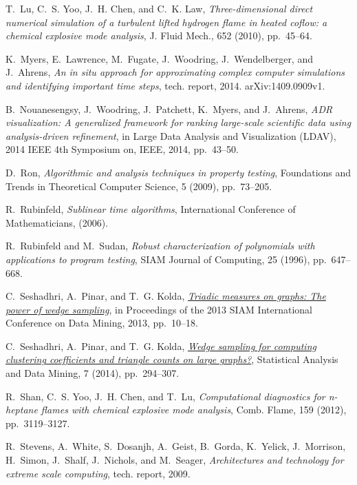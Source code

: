 \documentclass[final]{siamltex}
\begin{document}
\begin{thebibliography}{10}
{\sc T.~Lu, C.~S. Yoo, J.~H. Chen, and C.~K. Law}, {\em Three-dimensional
  direct numerical simulation of a turbulent lifted hydrogen flame in heated
  coflow: a chemical explosive mode analysis}, J. Fluid Mech., 652 (2010),
  pp.~45--64.

{\sc K.~Myers, E.~Lawrence, M.~Fugate, J.~Woodring, J.~Wendelberger, and
  J.~Ahrens}, {\em An in situ approach for approximating complex computer
  simulations and identifying important time steps}, tech. report, 2014.
\newblock arXiv:1409.0909v1.

{\sc B.~Nouanesengsy, J.~Woodring, J.~Patchett, K.~Myers, and J.~Ahrens}, {\em
  {ADR} visualization: A generalized framework for ranking large-scale
  scientific data using analysis-driven refinement}, in Large Data Analysis and
  Visualization (LDAV), 2014 IEEE 4th Symposium on, IEEE, 2014, pp.~43--50.

{\sc D.~Ron}, {\em Algorithmic and analysis techniques in property testing},
  Foundations and Trends in Theoretical Computer Science, 5 (2009),
  pp.~73--205.

{\sc R.~Rubinfeld}, {\em Sublinear time algorithms}, International Conference
  of Mathematicians,  (2006).

{\sc R.~Rubinfeld and M.~Sudan}, {\em Robust characterization of polynomials
  with applications to program testing}, SIAM Journal of Computing, 25 (1996),
  pp.~647--668.

{\sc C.~Seshadhri, A.~Pinar, and T.~G. Kolda},
  \href{http://dx.doi.org/10.1137/1.9781611972832.2}{{\em Triadic measures on
  graphs: The power of wedge sampling}}, in Proceedings of the 2013 SIAM
  International Conference on Data Mining, 2013, pp.~10--18.

{\sc C.~Seshadhri, A.~Pinar, and T.~G. Kolda},
  \href{http://dx.doi.org/10.1002/sam.11224}{{\em Wedge sampling for computing
  clustering coefficients and triangle counts on large graphs?}}, Statistical
  Analysis and Data Mining, 7 (2014), pp.~294--307.

{\sc R.~Shan, C.~S. Yoo, J.~H. Chen, and T.~Lu}, {\em Computational diagnostics
  for n-heptane flames with chemical explosive mode analysis}, Comb. Flame, 159
  (2012), pp.~3119--3127.

{\sc R.~Stevens, A.~White, S.~Dosanjh, A.~Geist, B.~Gorda, K.~Yelick,
  J.~Morrison, H.~Simon, J.~Shalf, J.~Nichols, and M.~Seager}, {\em
  Architectures and technology for extreme scale computing}, tech. report,
  2009.


\end{thebibliography}
\end{document}
